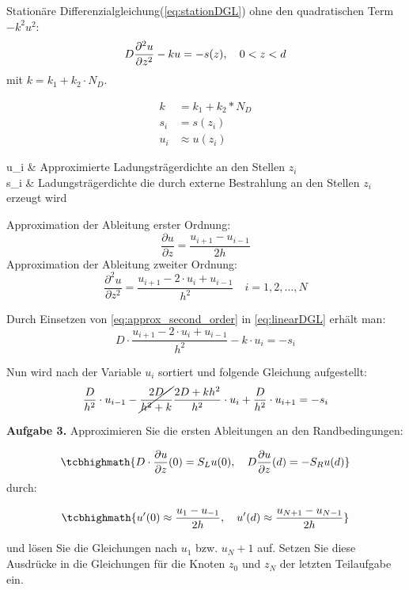 Stationäre Differenzialgleichung(\cref{eq:stationDGL}) ohne den quadratischen Term $-k^2u^2$:
\begin{equation}\label{eq:linearDGL}
	D \pdv[2]{u}{z} -ku=-s(z), \quad 0 <z<d
\end{equation}
mit $k=k_1+k_2\cdot N_D$.

\begin{align*}
	k&=k_1+k_2*N_D\\
	s_i&= s(z_i)\\
	u_i&\approx u(z_i)
\end{align*}
\begin{conditions}
	u_i & Approximierte Ladungsträgerdichte an den Stellen $z_i$ \\
	s_i & Ladungsträgerdichte die durch externe Bestrahlung an den Stellen $z_i$ erzeugt wird
\end{conditions}

Approximation der Ableitung erster Ordnung:
\begin{equation}\label{eq:approx_first_order}
	\frac{\partial u}{\partial z} = \frac{u_{i+1} - u_{i-1}}{2h}
\end{equation}
Approximation der Ableitung zweiter Ordnung:
\begin{equation}\label{eq:approx_second_order}
	\frac{\partial ^2 u }{\partial z^2} = \frac{u_{i+1} - 2\cdot u_i + u_{i-1}}{h^2} \quad i=1,2,\dots,N
\end{equation}

Durch Einsetzen von \cref{eq:approx_second_order} in \cref{eq:linearDGL} erhält man:
\begin{equation}
	D\cdot\frac{u_{i+1} - 2\cdot u_i + u_{i-1}}{h^2} -k\cdot u_i = -s_i
\end{equation}

Nun wird nach der Variable $u_i$ sortiert und folgende Gleichung aufgestellt:
\begin{equation}
\frac{D}{h^2}\cdot u_{i-1} - \cancel{\frac{2D}{h^2+k}} \frac{2D+kh^2}{h^2}\cdot u_i + \frac{D}{h^2}\cdot u_{i+1} = -s_i
\end{equation} 

\begin{mybox}
	\textbf{Aufgabe 3.}	Approximieren Sie die ersten Ableitungen an den Randbedingungen:
	
	\begin{equation}
	 \tcbhighmath{	D\cdot \frac{\partial u}{\partial z}(0)=S_Lu(0),\quad D\frac{\partial u}{\partial z}(d)=-S_Ru(d)}
	\end{equation}
	durch:
	
	\begin{equation}
	 \tcbhighmath{	u'(0) \approx \frac{u_1-u_{-1}}{2h}, \quad u'(d) \approx \frac{u_{N+1}-u_{N-1}}{2h}}
	\end{equation}
	
	und lösen Sie die Gleichungen nach $u_1$ bzw. $u_N+1$ auf. Setzen Sie diese Ausdrücke in die Gleichungen für die Knoten $z_0$ und $z_N$ der letzten Teilaufgabe ein.
\end{mybox}



